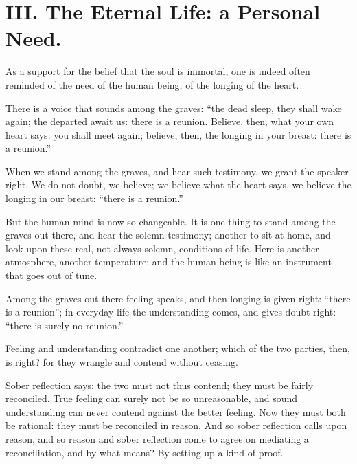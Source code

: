 \documentclass[12pt,a4paper]{book}
\begin{document}
\chapter*{III. The Eternal Life: a Personal Need.}
\label{ch:forel3}

As a support for the belief that the soul is immortal, one is indeed often reminded of the need of the human being, of the longing of the heart.

There is a voice that sounds among the graves: ``the dead sleep, they shall wake again; the departed await us: there is a reunion. Believe, then, what your own heart says: you shall meet again; believe, then, the longing in your breast: there is a reunion.''

When we stand among the graves, and hear such testimony, we grant the speaker right. We do not doubt, we believe; we believe what the heart says, we believe the longing in our breast: ``there is a reunion.''

But the human mind is now so changeable. It is one thing to stand among the graves out there, and hear the solemn testimony; another to sit at home, and look upon these real, not always solemn, conditions of life. Here is another atmosphere, another temperature; and the human being is like an instrument that goes out of tune.

Among the graves out there feeling speaks, and then longing is given right: ``there is a reunion''; in everyday life the understanding comes, and gives doubt right: ``there is surely no reunion.''

Feeling and understanding contradict one another; which of the two parties, then, is right? for they wrangle and contend without
ceasing.

Sober reflection says: the two must not thus contend; they must be fairly reconciled. True feeling can surely not be so unreasonable, and sound understanding can never contend against the better feeling. Now they must both be rational: they must be reconciled in reason. And so sober reflection calls upon reason, and so reason and sober reflection come to agree on mediating a reconciliation, and by what means? By setting up a kind of proof.
\end{document}
